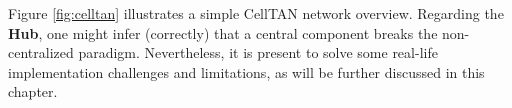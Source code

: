 Figure \ref{fig:celltan} illustrates a simple CellTAN network overview. Regarding the \textbf{Hub}, one might infer (correctly) that a central component breaks the non-centralized paradigm. Nevertheless, it is present to solve some real-life implementation challenges and limitations, as will be further discussed in this chapter.
